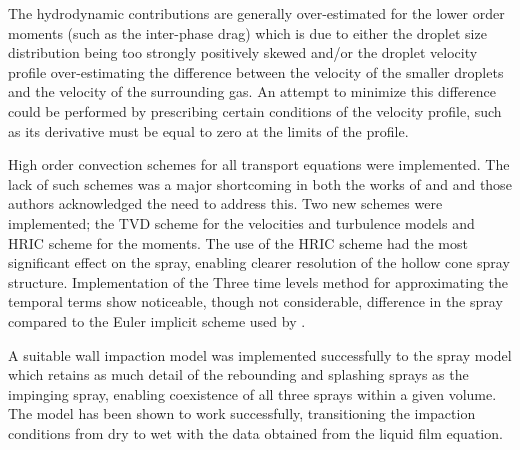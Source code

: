 \documentclass[a4paper,10pt]{article}
\def \PATH {./}
\def \REF {\PATH ./}
\begin{document}

The hydrodynamic contributions are generally over-estimated for the lower order moments (such as the inter-phase drag) which is due to either the droplet size distribution being too strongly positively skewed and/or the droplet velocity profile over-estimating the difference between the velocity of the smaller droplets and the velocity of the surrounding gas. An attempt to minimize this difference could be performed by prescribing certain conditions of the velocity profile, such as its derivative must be equal to zero at the limits of the profile.

High order convection schemes for all transport equations were implemented. The lack of such schemes was a major shortcoming in both the works of \cite{beck2000} and \cite{lemini2004} and those authors acknowledged the need to address this. Two new schemes were implemented; the TVD scheme for the velocities and turbulence models and HRIC scheme for the moments. The use of the HRIC scheme had the most significant effect on the spray, enabling clearer resolution of the hollow cone spray structure. Implementation of the Three time levels method for approximating the temporal terms show noticeable, though not considerable, difference in the spray compared to the Euler implicit scheme used by \cite{beck2000}.

A suitable wall impaction model was implemented successfully to the spray model which retains as much detail of the rebounding and splashing sprays as the impinging spray, enabling coexistence of all three sprays within a given volume. The model has been shown to work successfully, transitioning the impaction conditions from dry to wet with the data obtained from the liquid film equation.

% 




\end{document}
